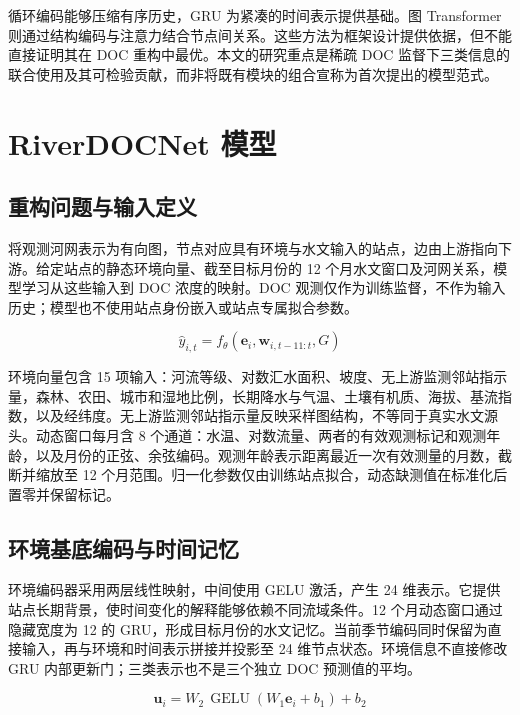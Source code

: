 \documentclass[UTF8,11pt,a4paper,fontset=none]{ctexart}
\begin{document}
循环编码能够压缩有序历史，GRU 为紧凑的时间表示提供基础\cite{cho2014}。图 Transformer 则通过结构编码与注意力结合节点间关系\cite{ying2021}。这些方法为框架设计提供依据，但不能直接证明其在 DOC 重构中最优。本文的研究重点是稀疏 DOC 监督下三类信息的联合使用及其可检验贡献，而非将既有模块的组合宣称为首次提出的模型范式。


\section{RiverDOCNet 模型}

\subsection{重构问题与输入定义}

将观测河网表示为有向图，节点对应具有环境与水文输入的站点，边由上游指向下游。给定站点的静态环境向量、截至目标月份的 12 个月水文窗口及河网关系，模型学习从这些输入到 DOC 浓度的映射。DOC 观测仅作为训练监督，不作为输入历史；模型也不使用站点身份嵌入或站点专属拟合参数。


\begin{equation}
\widehat y_{i,t}=f_\theta\!\left(\mathbf e_i,\mathbf w_{i,t-11:t},G\right)
\end{equation}

环境向量包含 15 项输入：河流等级、对数汇水面积、坡度、无上游监测邻站指示量，森林、农田、城市和湿地比例，长期降水与气温、土壤有机质、海拔、基流指数，以及经纬度。无上游监测邻站指示量反映采样图结构，不等同于真实水文源头。动态窗口每月含 8 个通道：水温、对数流量、两者的有效观测标记和观测年龄，以及月份的正弦、余弦编码。观测年龄表示距离最近一次有效测量的月数，截断并缩放至 12 个月范围。归一化参数仅由训练站点拟合，动态缺测值在标准化后置零并保留标记。


\subsection{环境基底编码与时间记忆}

环境编码器采用两层线性映射，中间使用 GELU 激活，产生 24 维表示。它提供站点长期背景，使时间变化的解释能够依赖不同流域条件。12 个月动态窗口通过隐藏宽度为 12 的 GRU，形成目标月份的水文记忆。当前季节编码同时保留为直接输入，再与环境和时间表示拼接并投影至 24 维节点状态。环境信息不直接修改 GRU 内部更新门；三类表示也不是三个独立 DOC 预测值的平均。


\begin{equation}
\mathbf u_i=W_2\,\operatorname{GELU}(W_1\mathbf e_i+b_1)+b_2
\end{equation}
\end{document}
